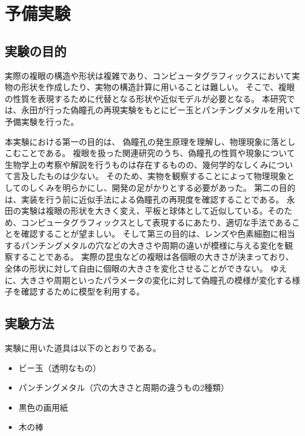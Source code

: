 \chapter{予備実験}
\label{CExperiment}

\section{実験の目的}
\label{SExperimentPurpose}


実際の複眼の構造や形状は複雑であり、コンピュータグラフィックスにおいて実物の形状を作成したり、実物の構造計算に用いることは難しい。
そこで、複眼の性質を表現するために代替となる形状や近似モデルが必要となる。
本研究では、永田\cite{}が行った偽瞳孔の再現実験をもとにビー玉とパンチングメタルを用いて予備実験を行った。

本実験における第一の目的は、 偽瞳孔の発生原理を理解し、物理現象に落としこむことである。
複眼を扱った関連研究のうち、偽瞳孔の性質や現象について生物学上の考察や解説を行うものは存在するものの、幾何学的なしくみについて言及したものは少ない。
そのため、実物を観察することによって物理現象としてのしくみを明らかにし、開発の足がかりとする必要があった。
第二の目的は、実装を行う前に近似手法による偽瞳孔の再現度を確認することである。
永田の実験は複眼の形状を大きく変え、平板と球体として近似している。そのため、コンピュータグラフィックスとして表現するにあたり、適切な手法であることを確認することが望ましい。
そして第三の目的は、レンズや色素細胞に相当するパンチングメタルの穴などの大きさや周期の違いが模様に与える変化を観察することである。
実際の昆虫などの複眼は各個眼の大きさが決まっており、全体の形状に対して自由に個眼の大きさを変化させることができない。
ゆえに、大きさや周期といったパラメータの変化に対して偽瞳孔の模様が変化する様子を確認するために模型を利用する。

\section{実験方法}
\label{SExperimentMethod}

実験に用いた道具は以下のとおりである\figref{}。

\begin{itemize}
\item ビー玉（透明なもの）
\item パンチングメタル（穴の大きさと周期の違うもの2種類）
\item 黒色の画用紙
\item 木の棒
\end{itemize}

